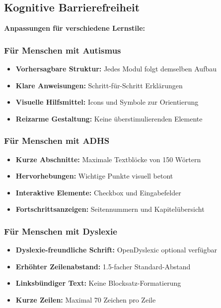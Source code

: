 \subsection{Kognitive Barrierefreiheit}

\begin{ctmmOrangeBox}[title=Neurodiverse-freundliche Strukturierung]

\textbf{Anpassungen für verschiedene Lernstile:}

\subsubsection{Für Menschen mit Autismus}
\begin{itemize}
    \item \textbf{Vorhersagbare Struktur:} Jedes Modul folgt demselben Aufbau
    \item \textbf{Klare Anweisungen:} Schritt-für-Schritt Erklärungen
    \item \textbf{Visuelle Hilfsmittel:} Icons und Symbole zur Orientierung
    \item \textbf{Reizarme Gestaltung:} Keine überstimulierenden Elemente
\end{itemize}

\subsubsection{Für Menschen mit ADHS}
\begin{itemize}
    \item \textbf{Kurze Abschnitte:} Maximale Textblöcke von 150 Wörtern
    \item \textbf{Hervorhebungen:} Wichtige Punkte visuell betont
    \item \textbf{Interaktive Elemente:} Checkbox und Eingabefelder
    \item \textbf{Fortschrittsanzeigen:} Seitennummern und Kapitelübersicht
\end{itemize}

\subsubsection{Für Menschen mit Dyslexie}
\begin{itemize}
    \item \textbf{Dyslexie-freundliche Schrift:} OpenDyslexic optional verfügbar
    \item \textbf{Erhöhter Zeilenabstand:} 1.5-facher Standard-Abstand
    \item \textbf{Linksbündiger Text:} Keine Blocksatz-Formatierung
    \item \textbf{Kurze Zeilen:} Maximal 70 Zeichen pro Zeile
\end{itemize}

\end{ctmmOrangeBox}

